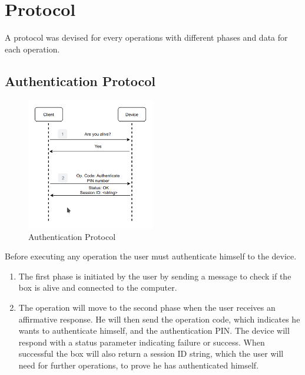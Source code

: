 \section{Protocol} \label{chap:arch:protocol}

A protocol was devised for every operations with different phases and data for each operation.

\subsection{Authentication Protocol} \label{chap:arch:protocol:auth}

\begin{figure}[h]
    \centering
    \includegraphics[width=0.5\textwidth]{./Images/authentication.png}
    \caption{Authentication Protocol}
    \label{fig:protocol:authentication}
\end{figure}

Before executing any operation the user must authenticate himself to the device.
\begin{enumerate}
    \item The first phase is initiated by the user by sending a message to check if the box is alive and connected to the computer.
    \item The operation will move to the second phase when the user receives an affirmative response. He will then send the operation code, which indicates he wants to authenticate himself, and the authentication PIN. The device will respond with a status parameter indicating failure or success. When successful the box will also return a session ID string, which the user will need for further operations, to prove he has authenticated himself.
\end{enumerate}

